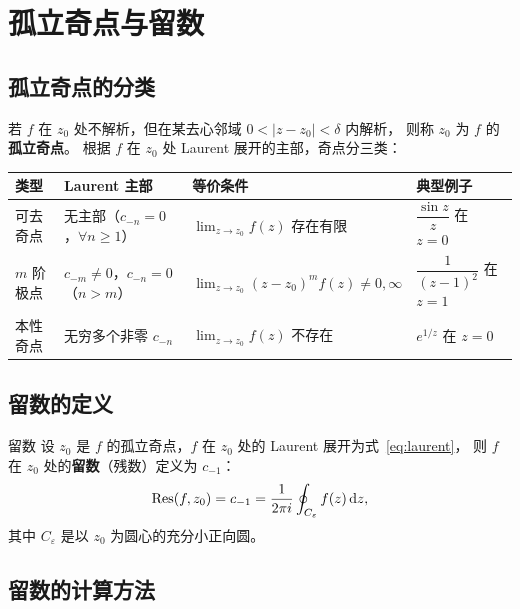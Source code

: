 \section{孤立奇点与留数}

\subsection{孤立奇点的分类}\label{sec:singularity}

若 $f$ 在 $z_0$ 处不解析，但在某去心邻域 $0<|z-z_0|<\delta$ 内解析，
则称 $z_0$ 为 $f$ 的\textbf{孤立奇点}。
根据 $f$ 在 $z_0$ 处 Laurent 展开的主部，奇点分三类：

\begin{center}
\renewcommand{\arraystretch}{1.9}
\begin{tabular}{lp{4.0cm}p{5.0cm}l}
\toprule
类型 & Laurent 主部 & 等价条件 & 典型例子 \\
\midrule
可去奇点 &
无主部（$c_{-n}=0$，$\forall n\ge1$）&
$\displaystyle\lim_{z\to z_0}f(z)$ 存在有限 &
$\dfrac{\sin z}{z}$ 在 $z=0$ \\[6pt]
$m$ 阶极点 &
$c_{-m}\ne0$，$c_{-n}=0$（$n>m$）&
$\displaystyle\lim_{z\to z_0}(z-z_0)^m f(z)\ne0,\infty$ &
$\dfrac{1}{(z-1)^2}$ 在 $z=1$ \\[6pt]
本性奇点 &
无穷多个非零 $c_{-n}$ &
$\displaystyle\lim_{z\to z_0}f(z)$ 不存在 &
$e^{1/z}$ 在 $z=0$ \\
\bottomrule
\end{tabular}
\end{center}

\subsection{留数的定义}

\begin{definition}{留数}{}
\label{def:residue}
设 $z_0$ 是 $f$ 的孤立奇点，$f$ 在 $z_0$ 处的 Laurent 展开为式~\eqref{eq:laurent}，
则 $f$ 在 $z_0$ 处的\textbf{留数}（残数）定义为 $c_{-1}$：
\begin{equation}
  \operatorname{Res}(f,z_0) = c_{-1} = \frac{1}{2\pi i}\oint_{C_\varepsilon} f(z)\,\mathrm{d} z,
  \label{eq:res_def}
\end{equation}
其中 $C_\varepsilon$ 是以 $z_0$ 为圆心的充分小正向圆。
\end{definition}

\subsection{留数的计算方法}

